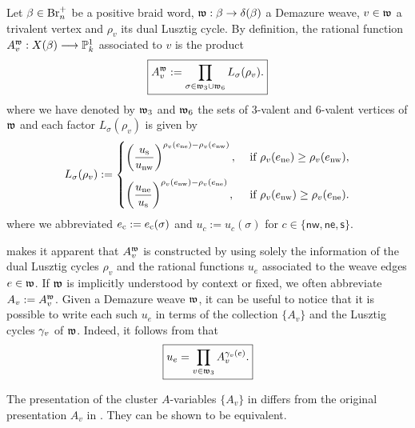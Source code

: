 \begin{fdef}\label{def:cluster_Avariables_weave}
Let $\beta\in\mbox{Br}_n^+$ be a positive braid word, $\mathfrak{w}:\beta\to\delta(\beta)$ a Demazure weave, $v\in\mathfrak{w}$ a trivalent vertex and $\rho_v$ its dual Lusztig cycle. By definition, the rational function $A^{\mathfrak{w}}_v:X(\beta)\longrightarrow\mathbb{P}_k^1$ associated to $v$ is the product
\begin{equation}\label{eq:cluster_A_variables}
\boxed{
A^{\mathfrak{w}}_v:=\prod_{\sigma\in \mathfrak{w}_3\cup \mathfrak{w}_6}L_\sigma(\rho_v).
}
\end{equation}
where we have denoted by $\mathfrak{w}_3$ and $\mathfrak{w}_6$ the sets of 3-valent and 6-valent vertices of $\mathfrak{w}$ and each factor $L_\sigma(\rho_v)$ is given by
$$L_\sigma(\rho_v):=
\begin{cases}
\displaystyle
\left(\frac{u_{\rm s}}{u_{\rm nw}}\right)^{\rho_v(e_{\rm ne})-\rho_v(e_{\rm nw})},
&\mbox{ if }\rho_v(e_{\rm ne})\ge \rho_v(e_{\rm nw}),\\[1.2em]
\displaystyle
\left(\frac{u_{\rm ne}}{u_{\rm s}}\right)^{\rho_v(e_{\rm nw})-\rho_v(e_{\rm ne})},
&\mbox{ if }\rho_v(e_{\rm nw})\ge \rho_v(e_{\rm ne}).
\end{cases}$$
where we abbreviated $e_{\rm c}:=e_{\rm c}(\sigma)$ and $u_{c}:=u_c(\sigma)$ for $c\in\{\mathsf{nw},\mathsf{ne},\mathsf{s}\}$.\sbs
\end{fdef}
\vspace{0.2cm}
 makes it apparent that $A^{\mathfrak{w}}_v$ is constructed by using solely the information of the dual Lusztig cycles $\rho_v$ and the rational functions $u_e$ associated to the weave edges $e\in\mathfrak{w}$. If $\mathfrak{w}$ is implicitly understood by context or fixed, we often abbreviate $A_v:=A^{\mathfrak{w}}_v$. Given a Demazure weave $\mathfrak{w}$, it can be useful to notice that it is possible to write each such $u_e$ in terms of the collection $\{A_v\}$ and the Lusztig cycles $\gamma_v$ of $\mathfrak{w}$. Indeed, it follows from \cite[Theorem 5.12]{CGGLSS25} that
\begin{equation}\label{eq:u_via_cluster_A_variables}
\boxed{
u_e=\prod_{v\in\mathfrak{w}_3}A_v^{\gamma_v(e)}.
}
\end{equation}

\begin{remark}\label{rmk:Avars_different_defs} The presentation of the cluster $A$-variables $\{A_v\}$ in  differs from the original presentation $A_v$ in \cite[Section 5]{CGGLSS25}. They can be shown to be equivalent.\sbs
\end{remark}


